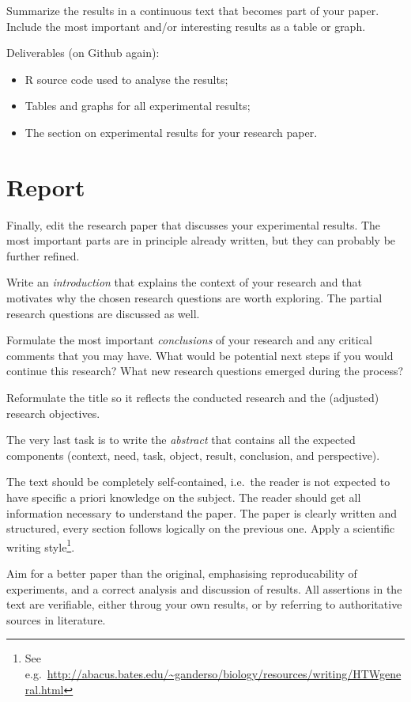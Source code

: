 \documentclass[fleqn,10pt]{artikeltin}
\begin{document}
Summarize the results in a continuous text that becomes part of your paper. Include the most important and/or interesting results as a table or graph.

Deliverables (on Github again):

\begin{itemize}
    \item R source code used to analyse the results;
	\item Tables and graphs for all experimental results;
	\item The section on experimental results for your research paper.
\end{itemize}

\section{Report}
\label{sec:report}

Finally, edit the research paper that discusses your experimental results. The most important parts are in principle already written, but they can probably be further refined.

Write an \emph{introduction} that explains the context of your research and that motivates why the chosen research questions are worth exploring. The partial research questions are discussed as well.

Formulate the most important \emph{conclusions} of your research and any critical comments that you may have. What would be potential next steps if you would continue this research? What new research questions emerged during the process?

Reformulate the title so it reflects the conducted research and the (adjusted) research objectives.

The very last task is to write the \emph{abstract} that contains all the expected components (context, need, task, object, result, conclusion, and perspective).

The text should be completely self-contained, i.e.~the reader is not expected to have specific a priori knowledge on the subject. The reader should get all information necessary to understand the paper. The paper is clearly written and structured, every section follows logically on the previous one. Apply a scientific writing style\footnote{See e.g.~\url{http://abacus.bates.edu/~ganderso/biology/resources/writing/HTWgeneral.html}}.

Aim for a better paper than the original, emphasising reproducability of experiments, and a correct analysis and discussion of results. All assertions in the text are verifiable, either throug your own results, or by referring to authoritative sources in literature.
\end{document}
